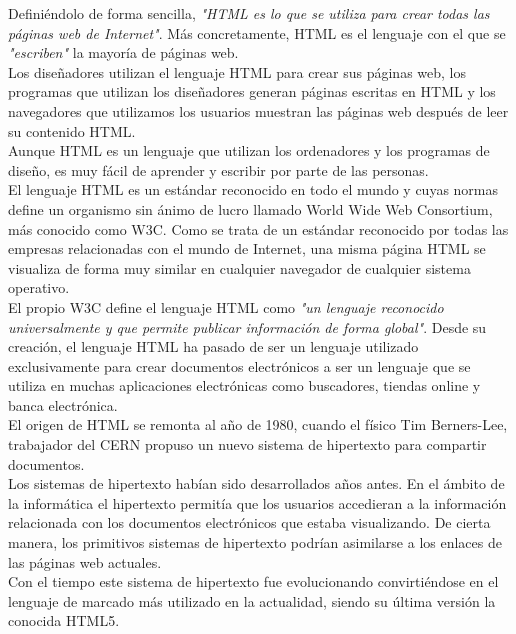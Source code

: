Defini\'endolo de forma sencilla, \textsl{"HTML es lo que se utiliza para crear todas las p\'aginas web de Internet"}. M\'as concretamente, HTML es el lenguaje con el que se \textsl{"escriben"} la mayor\'ia de p\'aginas web.\\

Los dise\~nadores utilizan el lenguaje HTML para crear sus p\'aginas web, los programas que utilizan los dise\~nadores generan p\'aginas escritas en HTML y los navegadores que utilizamos los usuarios muestran las p\'aginas web despu\'es de leer su contenido HTML.\\

Aunque HTML es un lenguaje que utilizan los ordenadores y los programas de dise\~no, es muy f\'acil de aprender y escribir por parte de las personas.\\

El lenguaje HTML es un est\'andar reconocido en todo el mundo y cuyas normas define un organismo sin \'animo de lucro llamado World Wide Web Consortium, m\'as conocido como W3C. Como se trata de un est\'andar reconocido por todas las empresas relacionadas con el mundo de Internet, una misma p\'agina HTML se visualiza de forma muy similar en cualquier navegador de cualquier sistema operativo.\\

El propio W3C define el lenguaje HTML como \textsl{"un lenguaje reconocido universalmente y que permite publicar informaci\'on de forma global"}. Desde su creaci\'on, el lenguaje HTML ha pasado de ser un lenguaje utilizado exclusivamente para crear documentos electr\'onicos a ser un lenguaje que se utiliza en muchas aplicaciones electr\'onicas como buscadores, tiendas online y banca electr\'onica.\\

El origen de HTML se remonta al a\~no de 1980, cuando el f\'isico Tim Berners-Lee, trabajador del CERN propuso un nuevo sistema de hipertexto para compartir documentos.\\

Los sistemas de hipertexto hab\'ian sido desarrollados a\~nos antes. En el \'ambito de la inform\'atica el hipertexto permit\'ia que los usuarios accedieran a la informaci\'on relacionada con los documentos electr\'onicos que estaba visualizando. De cierta manera, los primitivos sistemas de hipertexto podr\'ian asimilarse a los enlaces de las p\'aginas web actuales.\\

Con el tiempo este sistema de hipertexto fue evolucionando convirti\'endose en el lenguaje de marcado m\'as utilizado en la actualidad, siendo su \'ultima versi\'on la conocida HTML5.\\

